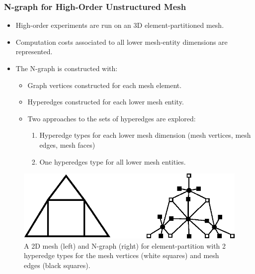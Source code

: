 \documentclass[aspectratio=169]{beamer}
\begin{document}
\begin{frame}
  \frametitle{N-graph for High-Order Unstructured Mesh}
  \begin{itemize}
  \item High-order experiments are run on an 3D element-partitioned mesh.
  \item Computation costs associated to all lower mesh-entity dimensions are represented.
  \item The N-graph is constructed with:
    \begin{itemize}
    \item Graph vertices constructed for each mesh element.
    \item Hyperedges constructed for each lower mesh entity.
    \item Two approaches to the sets of hyperedges are explored:
      \begin{enumerate}
      \item Hyperedge types for each lower mesh dimension (mesh vertices, mesh edges, mesh faces)
      \item One hyperedges type for all lower mesh entities.
      \end{enumerate}
    \end{itemize}
  \end{itemize}
  \begin{figure}
    \centering
    \includegraphics[height=.25\textheight]{meshToNgraphs.eps}
    \caption*{A 2D mesh (left) and N-graph (right) for element-partition with 2 hyperedge types for the mesh vertices (white squares) and mesh edges (black squares).}
  \end{figure}

\end{frame}
\end{document}
